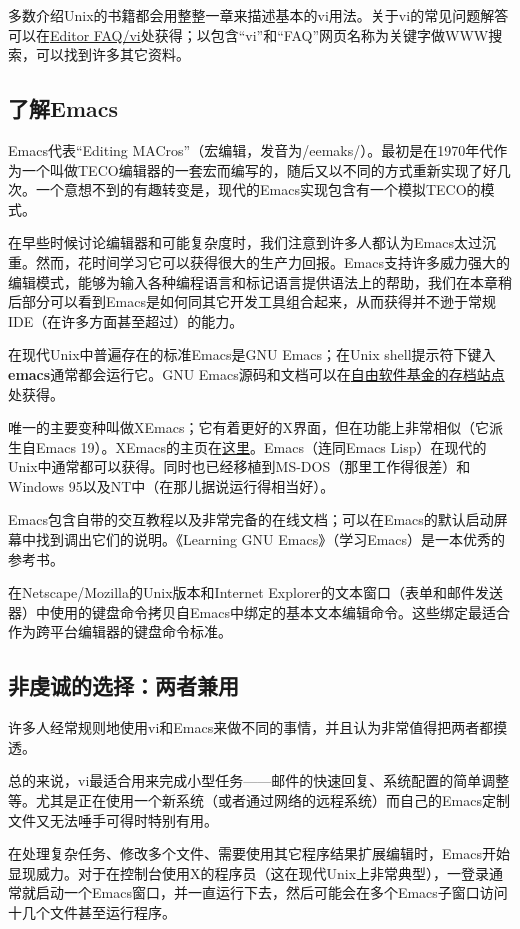 \documentclass[12pt,oneside]{book}
\begin{document}
\begin{common-format}
多数介绍Unix的书籍都会用整整一章来描述基本的vi用法。关于vi的常见问题解答可以在\href{http://www.faqs.org/faqs/editor-faq/vi/}{Editor FAQ/vi}处获得；以包含“vi”和“FAQ”网页名称为关键字做WWW搜索，可以找到许多其它资料。


\subsection{了解Emacs}
Emacs代表“Editing MACros”（宏编辑，发音为/eemaks/）。最初是在1970年代作为一个叫做TECO编辑器的一套宏而编写的，随后又以不同的方式重新实现了好几次。一个意想不到的有趣转变是，现代的Emacs实现包含有一个模拟TECO的模式。

在早些时候讨论编辑器和可能复杂度时，我们注意到许多人都认为Emacs太过沉重。然而，花时间学习它可以获得很大的生产力回报。Emacs支持许多威力强大的编辑模式，能够为输入各种编程语言和标记语言提供语法上的帮助，我们在本章稍后部分可以看到Emacs是如何同其它开发工具组合起来，从而获得并不逊于常规IDE（在许多方面甚至超过）的能力。

在现代Unix中普遍存在的标准Emacs是GNU Emacs；在Unix shell提示符下键入\textbf{emacs}通常都会运行它。GNU Emacs源码和文档可以在\href{ftp://gnu.org/pub/gnu}{自由软件基金的存档站点}处获得。

唯一的主要变种叫做XEmacs；它有着更好的X界面，但在功能上非常相似（它派生自Emacs 19）。XEmacs的主页在\href{http://www.xemacs.org/}{这里}。Emacs（连同Emacs Lisp）在现代的Unix中通常都可以获得。同时也已经移植到MS-DOS（那里工作得很差）和Windows 95以及NT中（在那儿据说运行得相当好）。

Emacs包含自带的交互教程以及非常完备的在线文档；可以在Emacs的默认启动屏幕中找到调出它们的说明。《Learning GNU Emacs》（学习Emacs）\cite{Cameron}是一本优秀的参考书。

在Netscape/Mozilla的Unix版本和Internet Explorer的文本窗口（表单和邮件发送器）中使用的键盘命令拷贝自Emacs中绑定的基本文本编辑命令。这些绑定最适合作为跨平台编辑器的键盘命令标准。

\subsection{非虔诚的选择：两者兼用}
许多人经常规则地使用vi和Emacs来做不同的事情，并且认为非常值得把两者都摸透。

总的来说，vi最适合用来完成小型任务——邮件的快速回复、系统配置的简单调整等。尤其是正在使用一个新系统（或者通过网络的远程系统）而自己的Emacs定制文件又无法唾手可得时特别有用。

在处理复杂任务、修改多个文件、需要使用其它程序结果扩展编辑时，Emacs开始显现威力。对于在控制台使用X的程序员（这在现代Unix上非常典型），一登录通常就启动一个Emacs窗口，并一直运行下去，然后可能会在多个Emacs子窗口访问十几个文件甚至运行程序。


\end{common-format}
\end{document}
